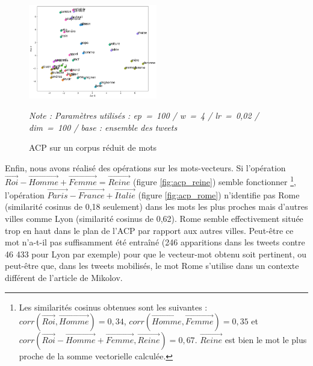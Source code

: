 \documentclass[11pt,french,french]{article}
\let\rmarkdownfootnote\footnote%
\def\footnote{\protect\rmarkdownfootnote}
\begin{document}
\begin{figure}
\begin{center}
\includegraphics[width=0.5\textwidth]{img/acp_gensim.png}
\captionsetup{margin=0cm,format=hang,justification=justified}
\caption{ACP sur un corpus réduit de mots}\label{fig:acp_gensim}
\end{center}
\vspace{-0.3cm}
\footnotesize
\emph{Note : Paramètres utilisés : ep = 100 / w = 4 / lr = 0,02 / dim = 100 / base : ensemble des tweets }
\end{figure}

Enfin, nous avons réalisé des opérations sur les mots-vecteurs.
Si l'opération \(\overrightarrow{Roi} - \overrightarrow{Homme} + \overrightarrow{Femme} = \overrightarrow{Reine}\) (figure \ref{fig:acp_reine}) semble fonctionner
\footnote{Les similarités cosinus obtenues sont les suivantes : \(corr(\overrightarrow{Roi}, \overrightarrow{Homme}) = 0,34\), \(corr(\overrightarrow{Homme}, \overrightarrow{Femme}) = 0,35\) et \(corr(\overrightarrow{Roi} - \overrightarrow{Homme} + \overrightarrow{Femme} , \overrightarrow{Reine}) = 0,67\). \(\overrightarrow{Reine}\) est bien le mot le plus proche de la somme vectorielle calculée.}, l'opération \(\overrightarrow{Paris} - \overrightarrow{France} + \overrightarrow{Italie}\) (figure \ref{fig:acp_rome}) n'identifie pas \og Rome \fg{} (similarité cosinus de 0,18 seulement) dans les mots les plus proches mais d'autres villes comme \og Lyon \fg{} (similarité cosinus de 0,62).
\og Rome \fg{} semble effectivement située \og trop en haut\fg{} dans le plan de l'ACP par rapport aux autres villes.
Peut-être ce mot n'a-t-il pas suffisamment été entraîné (246 apparitions dans les tweets contre 46 433 pour Lyon par exemple) pour que le vecteur-mot obtenu soit pertinent, ou peut-être que, dans les tweets mobilisés, le mot \og Rome \fg{} s'utilise dans un contexte différent de l'article de Mikolov.
\end{document}
